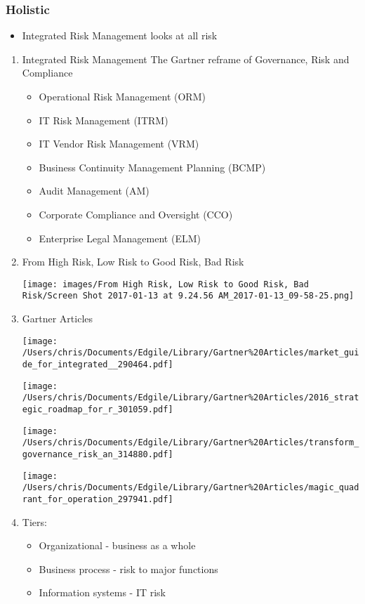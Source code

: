 \documentclass[11pt]{article}
\begin{document}
\subsubsection{Holistic}
\label{sec:org65916e3}
\begin{itemize}
\item Integrated Risk Management looks at all risk
\end{itemize}
\begin{enumerate}
\item Integrated Risk Management
\label{sec:orge655830}
The Gartner reframe of Governance, Risk and Compliance
\begin{itemize}
\item Operational Risk Management (ORM)
\item IT Risk Management (ITRM)
\item IT Vendor Risk Management (VRM)
\item Business Continuity Management Planning (BCMP)
\item Audit Management (AM)
\item Corporate Compliance and Oversight (CCO)
\item Enterprise Legal Management (ELM)
\end{itemize}

\item From High Risk, Low Risk to Good Risk, Bad Risk
\label{sec:orga521353}


\begin{center}
\texttt{[image: images/From High Risk, Low Risk to Good Risk, Bad Risk/Screen Shot 2017-01-13 at 9.24.56 AM\_2017-01-13\_09-58-25.png]}
\end{center}
\item Gartner Articles
\label{sec:org4755a14}

\begin{center}
\texttt{[image: /Users/chris/Documents/Edgile/Library/Gartner\%20Articles/market\_guide\_for\_integrated\_\_290464.pdf]}
\end{center}
\begin{center}
\texttt{[image: /Users/chris/Documents/Edgile/Library/Gartner\%20Articles/2016\_strategic\_roadmap\_for\_r\_301059.pdf]}
\end{center}
\begin{center}
\texttt{[image: /Users/chris/Documents/Edgile/Library/Gartner\%20Articles/transform\_governance\_risk\_an\_314880.pdf]}
\end{center}
\begin{center}
\texttt{[image: /Users/chris/Documents/Edgile/Library/Gartner\%20Articles/magic\_quadrant\_for\_operation\_297941.pdf]}
\end{center}
\item Tiers:
\label{sec:org8e6c7f3}
\begin{itemize}
\item Organizational - business as a whole
\item Business process - risk to major functions
\item Information systems - IT risk
\end{itemize}
\end{enumerate}
\end{document}
